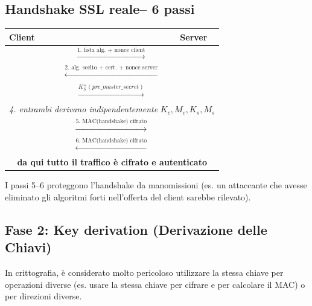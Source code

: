 \documentclass[a4paper,12pt]{report}
\renewcommand{\arraystretch}{1.2} %
\begin{document}
\subsection*{Handshake SSL reale-- 6 passi}

\begin{center}
\renewcommand{\arraystretch}{1.4}
\begin{tabular}{|p{4.5cm}|c|p{4.5cm}|}
\hline
\textbf{Client} & & \textbf{Server} \\
\hline
& $\xrightarrow{\displaystyle\text{1. lista alg. + nonce client}}$ & \\
& $\xleftarrow{\displaystyle\text{2. alg. scelto + cert. + nonce server}}$ & \\
& $\xrightarrow{\displaystyle K_S^+(\mathit{pre\_master\_secret})}$ & \\
\multicolumn{3}{|c|}{\textit{4. entrambi derivano indipendentemente} $K_c, M_c, K_s, M_s$} \\
& $\xrightarrow{\displaystyle\text{5. MAC(handshake) cifrato}}$ & \\
& $\xleftarrow{\displaystyle\text{6. MAC(handshake) cifrato}}$ & \\
\multicolumn{3}{|c|}{\textcolor{okgreen}{\textbf{da qui tutto il traffico \`e cifrato e autenticato}}} \\
\hline
\end{tabular}
\end{center}

I passi 5--6 proteggono l'handshake da manomissioni (es. un attaccante che
avesse eliminato gli algoritmi forti nell'offerta del client sarebbe rilevato).

\newpage
\subsection{Fase 2: Key derivation (Derivazione delle Chiavi)}
In crittografia, è considerato molto pericoloso utilizzare la stessa chiave per operazioni diverse (es. usare la stessa chiave per cifrare e per calcolare il MAC) o per direzioni diverse.
\end{document}
